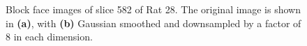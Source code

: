 		\begin{figure}[htbp]
		  \centering
		  \caption{Block face images of slice 582 of Rat 28. The original image is shown in \textbf{(a)}, with \textbf{(b)} Gaussian smoothed and downsampled by a factor of 8 in each dimension.}
		  \label{fig:original_lores_images}
		\end{figure}
    
